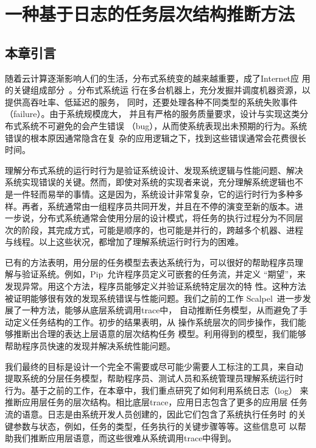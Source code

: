 \chapter{一种基于日志的任务层次结构推断方法}
\label{chap:logmining}

\section{本章引言}

随着云计算逐渐影响人们的生活，分布式系统变的越来越重要，成了Internet应
用的关键组成部分~\cite{gfs, mapreduce, bigtable, dynamo}。分布式系统运
行在多台机器上，充分发掘并调度机器资源，以提供高吞吐率、低延迟的服务，
同时，还要处理各种不同类型的系统失败事件（failure）。由于系统规模庞大，
并且有严格的服务质量要求，设计与实现这类分布式系统不可避免的会产生错误
（bug），从而使系统表现出未预期的行为。系统错误的根本原因通常隐含在复
杂的应用逻辑之下，找到这些错误通常会花费很长时间。

理解分布式系统的运行时行为是验证系统设计、发现系统逻辑与性能问题、解决
系统实现错误的关键。然而，即使对系统的实现者来说，充分理解系统逻辑也不
是一件轻而易举的事情。这是因为，系统设计非常复杂，它的运行时行为多种多
样。再者，系统通常由一组程序员共同开发，并且在不停的演变至新的版本。进
一步说，分布式系统通常会使用分层的设计模式，将任务的执行过程分为不同层
次的阶段，其完成方式，可能是顺序的，也可能是并行的，跨越多个机器、进程
与线程。以上这些状况，都增加了理解系统运行时行为的困难。

已有的方法表明，用分层的任务模型去表达系统行为，可以很好的帮助程序员理
解与验证系统。例如，Pip~\cite{pip}允许程序员定义可嵌套的任务流，并定义
“期望”，来发现异常。用这个方法，程序员能够定义并验证系统特定层次的特
性。这种方法被证明能够很有效的发现系统错误与性能问题。我们之前的工作
Scalpel~\cite{scalpel}进一步发展了一种方法，能够从底层系统调用trace中，
自动推断任务模型，从而避免了手动定义任务结构的工作。初步的结果表明，从
操作系统层次的同步操作，我们能够推断出合理的表达上层语意的层次结构任务
模型。利用得到的模型，我们能够帮助程序员快速的发现并解决系统性能问题。

我们最终的目标是设计一个完全不需要或尽可能少需要人工标注的工具，来自动
提取系统的分层任务模型，帮助程序员、测试人员和系统管理员理解系统运行时
行为。基于之前的工作，在本章中，我们重点研究了如何利用系统日志（log）
来推断应用层任务的层次结构。相比底层trace，应用日志包含了更多的应用层
任务流的语意。日志是由系统开发人员创建的，因此它们包含了系统执行任务时
的关键参数与状态，例如，任务的类型，任务执行的关键步骤等等。这些信息可
以帮助我们推断应用层语意，而这些很难从系统调用trace中得到。

